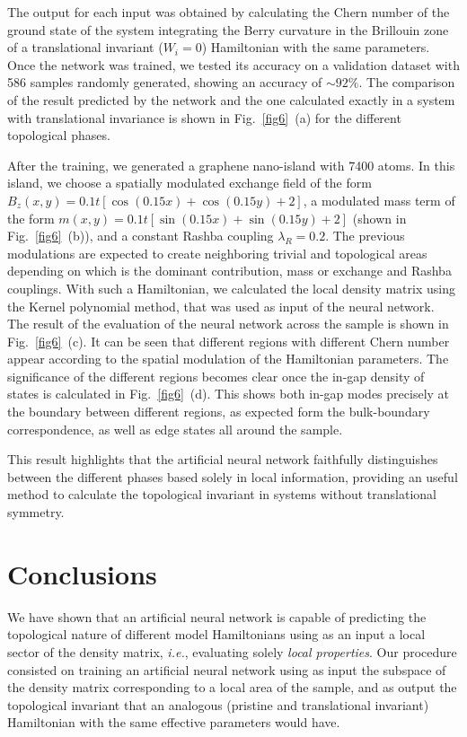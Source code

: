 The output for each input was obtained by calculating the Chern number of the
ground state of the system integrating the Berry curvature in the Brillouin zone
of a translational invariant ($W_i=0$) Hamiltonian with the same parameters.
Once the network was trained, we tested its  accuracy on a validation
dataset with 586 samples randomly generated,  showing an accuracy of $\sim92\%$.
The comparison of the result predicted by the network and the one calculated
exactly in  a system with translational invariance is shown in
Fig.~\ref{fig6}~(a) for the different topological phases.

After the training, we generated a graphene nano-island with 7400 atoms. In this
island, we choose a spatially modulated exchange field of the form
$B_z(x,y) = 0.1t[\cos(0.15 x)+\cos(0.15 y)+2]$, a modulated mass term of the form
$m(x,y) = 0.1t[\sin(0.15 x)+\sin(0.15 y)+2]$ (shown in Fig.~\ref{fig6}~(b)), and a
constant Rashba coupling $\lambda_R = 0.2$.
The previous modulations are expected to create neighboring trivial and
topological areas depending on which is the dominant contribution, mass or
exchange and Rashba couplings.
With such a Hamiltonian, we calculated the local density matrix using the Kernel
polynomial method, that was used as input of the neural network.
The result of the evaluation of the neural network across the sample is shown in
Fig.~\ref{fig6}~(c). %
It can be seen that different regions with different Chern number appear according
to the spatial modulation of the Hamiltonian parameters.
The significance of the different regions becomes clear once the in-gap density
of states is calculated in Fig.~\ref{fig6}~(d). This shows both in-gap modes
precisely at the boundary between different regions, as expected form the
bulk-boundary correspondence,  as well as edge states all around the sample.

This result  highlights that the artificial neural network faithfully distinguishes
between the different phases based solely in local information, providing an
useful method to calculate the topological invariant in systems without
translational symmetry.



\section{Conclusions}
\label{sec:Conc}
We have shown that an artificial neural network is capable of predicting the
topological nature of different model Hamiltonians using as an input a local
sector of the density matrix, {\em i.e.}, evaluating solely \emph{local properties}.
Our procedure consisted on training an artificial neural network using as
input the subspace of the density matrix corresponding to a local area of the
sample, and as output the topological invariant that an analogous (pristine and
translational invariant) Hamiltonian with the same effective parameters would
have.

